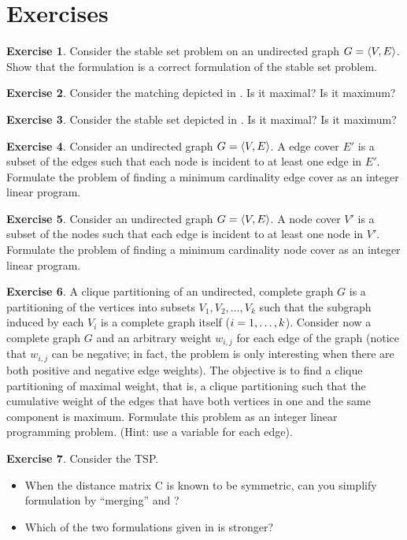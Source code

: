 \documentclass[titlepage]{book}
\theoremstyle{definition}
\newtheorem{exercise}{Exercise}
\begin{document}
\section*{Exercises}
\begin{exercise}
Consider the stable set problem on an undirected graph $G=\tupl{V,E}$. Show that the formulation  is a correct formulation of the stable set problem.
\end{exercise}
\begin{exercise}
Consider the matching depicted in . Is it maximal? Is it maximum?
\end{exercise}
\begin{exercise}
Consider the stable set depicted in . Is it maximal? Is it maximum?
\end{exercise}
\begin{exercise}
Consider an undirected graph $G=\tupl{V,E}$. A edge cover $E'$ is a subset of the edges such that each node is incident to at least one edge in $E'$. Formulate the problem of finding a minimum cardinality edge cover as an integer linear program.
\end{exercise}
\begin{exercise}
Consider an undirected graph $G=\tupl{V,E}$. A node cover $V'$ is a subset of the nodes such that each edge is incident to at least one node in $V'$. Formulate the problem of finding a minimum cardinality node cover as an integer linear program.
\end{exercise}
\begin{exercise}
A clique partitioning of an undirected, complete graph $G$ is a partitioning of the vertices into subsets $V_1,V_2,\ldots,V_k$ such that the subgraph induced by each $V_i$ is a complete graph itself ($\rangei[i]{1}{k}$). Consider now a complete graph $G$ and an arbitrary weight $w_{i,j}$ for each edge of the graph (notice that $w_{i,j}$ can be negative; in fact, the problem is only interesting when there are both positive and negative edge weights). The objective is to find a clique partitioning of maximal weight, that is, a clique partitioning such that the cumulative weight of the edges that have both vertices in one and the same component is maximum. Formulate this problem as an integer linear programming problem. (Hint: use a variable for each edge).
\end{exercise}
\begin{exercise}
Consider the TSP.
\begin{itemize}
 \item When the distance matrix C is known to be symmetric, can you simplify formulation  by ``merging''  and ?
 \item Which of the two formulations given in  is stronger?
\end{itemize}
\end{exercise}
\end{document}
